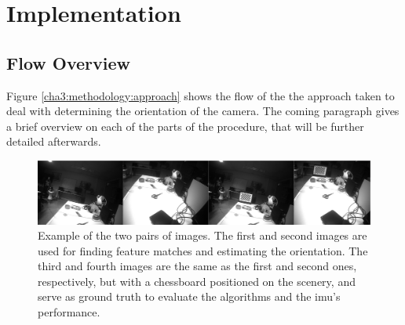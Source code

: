 
\chapter{Implementation}
\label{implementation}

\section{Flow Overview}

Figure \ref{cha3:methodology:approach} shows the flow of the  the approach taken to deal with determining the orientation of the camera. The coming paragraph gives a brief overview on each of the parts of the procedure, that will be further detailed afterwards.

\begin{figure}[ht]
	\centering
	\includegraphics[width=\textwidth]{images/imagesex.png}
	\caption[Example of the two pairs of images]{Example of the two pairs of images. The first and second images are used for finding feature matches and estimating the orientation. The third and fourth images are the same as the first and second ones, respectively, but with a chessboard positioned on the scenery, and serve as ground truth to evaluate the algorithms and the \acrshort{imu}'s performance.}
	\label{cha3:methodology:imagesex}
\end{figure}
	 
